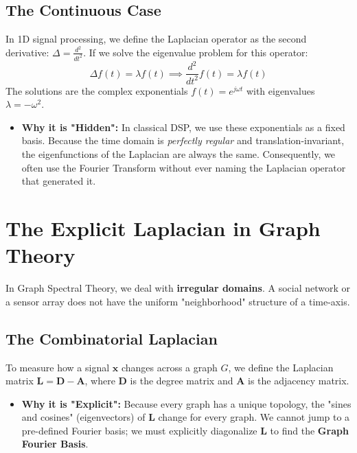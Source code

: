 \begin{notechapter}
\subsection{The Continuous Case}
In 1D signal processing, we define the Laplacian operator as the second derivative: $\Delta = \frac{d^2}{dt^2}$. If we solve the eigenvalue problem for this operator:
\begin{equation}
    \Delta f(t) = \lambda f(t) \implies \frac{d^2}{dt^2} f(t) = \lambda f(t)
\end{equation}
The solutions are the complex exponentials $f(t) = e^{j\omega t}$ with eigenvalues $\lambda = -\omega^2$.
\begin{itemize}
    \item \textbf{Why it is "Hidden":} In classical DSP, we use these exponentials as a fixed basis. Because the time domain is \textit{perfectly regular} and translation-invariant, the eigenfunctions of the Laplacian are always the same. Consequently, we often use the Fourier Transform without ever naming the Laplacian operator that generated it.
\end{itemize}

\section{The Explicit Laplacian in Graph Theory}
In Graph Spectral Theory, we deal with \textbf{irregular domains}. A social network or a sensor array does not have the uniform "neighborhood" structure of a time-axis.

\subsection{The Combinatorial Laplacian}
To measure how a signal $\mathbf{x}$ changes across a graph $G$, we define the Laplacian matrix $\mathbf{L} = \mathbf{D} - \mathbf{A}$, where $\mathbf{D}$ is the degree matrix and $\mathbf{A}$ is the adjacency matrix. 
\begin{itemize}
    \item \textbf{Why it is "Explicit":} Because every graph has a unique topology, the "sines and cosines" (eigenvectors) of $\mathbf{L}$ change for every graph. We cannot jump to a pre-defined Fourier basis; we must explicitly diagonalize $\mathbf{L}$ to find the \textbf{Graph Fourier Basis}.
\end{itemize}


\end{notechapter}
